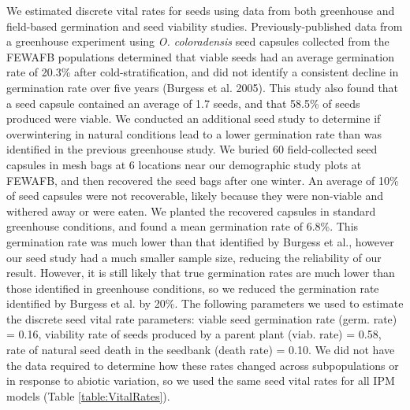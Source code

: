 \documentclass[12pt, letterpaper]{article}
\begin{document}
We estimated discrete vital rates for seeds using data from both greenhouse and field-based germination and seed viability studies. Previously-published data from a greenhouse experiment using \textit{O. coloradensis} seed capsules collected from the FEWAFB populations determined that viable seeds had an average germination rate of 20.3\% after cold-stratification, and did not identify a consistent decline in germination rate over five years (Burgess et al. 2005). This study also found that a seed capsule contained an average of 1.7 seeds, and that 58.5\% of seeds produced were viable. We conducted an additional seed study to determine if overwintering in natural conditions lead to a lower germination rate than was identified in the previous greenhouse study. We buried 60 field-collected seed capsules in mesh bags at 6 locations near our demographic study plots at FEWAFB, and then recovered the seed bags after one winter. An average of 10\% of seed capsules were not recoverable, likely because they were non-viable and withered away or were eaten. We planted the recovered capsules in standard greenhouse conditions, and found a mean germination rate of 6.8\%. This germination rate was much lower than that identified by Burgess et al., however our seed study had a much smaller sample size, reducing the reliability of our result. However, it is still likely that true germination rates are much lower than those identified in greenhouse conditions, so we reduced the germination rate identified by Burgess et al. by 20\%. The following parameters we used to estimate the discrete seed vital rate parameters: viable seed germination rate (germ. rate) = 0.16, viability rate of seeds produced by a parent plant (viab. rate) = 0.58, rate of natural seed death in the seedbank (death rate) = 0.10. We did not have the data required to determine how these rates changed across subpopulations or in response to abiotic variation, so we used the same seed vital rates for all IPM models (Table \ref{table:VitalRates}).  
\end{document}
